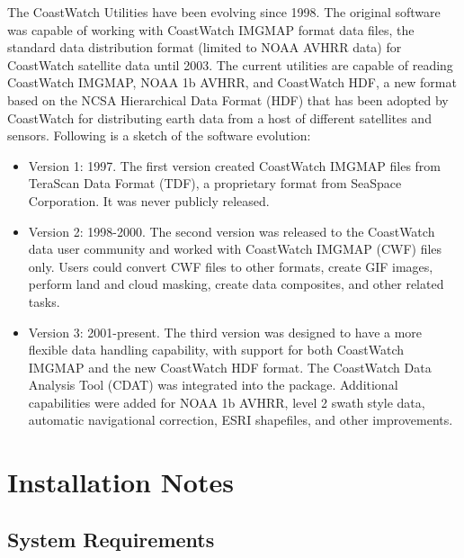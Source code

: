 The CoastWatch Utilities have been evolving since 1998.  The original
software was capable of working with CoastWatch IMGMAP format data
files, the standard data distribution format (limited to NOAA AVHRR
data) for CoastWatch satellite data until 2003.  The current utilities
are capable of reading CoastWatch IMGMAP, NOAA 1b AVHRR, and
CoastWatch HDF, a new format based on the NCSA Hierarchical Data
Format (HDF) that has been adopted by CoastWatch for distributing
earth data from a host of different satellites and sensors.  Following
is a sketch of the software evolution:
\begin{itemize}

  \item Version 1: 1997.  The first version created CoastWatch IMGMAP
  files from TeraScan Data Format (TDF), a proprietary format from
  SeaSpace Corporation.  It was never publicly released.

  \item Version 2: 1998-2000.  The second version was released to the
  CoastWatch data user community and worked with CoastWatch IMGMAP
  (CWF) files only.  Users could convert CWF files to other formats,
  create GIF images, perform land and cloud masking, create data
  composites, and other related tasks.  

  \item Version 3: 2001-present.  The third version was designed to have
  a more flexible data handling capability, with support for both
  CoastWatch IMGMAP and the new CoastWatch HDF format.  The CoastWatch
  Data Analysis Tool (CDAT) was integrated into the package.
  Additional capabilities were added for NOAA 1b AVHRR, level 2 swath
  style data, automatic navigational correction, ESRI shapefiles, and
  other improvements.

\end{itemize}

\section{Installation Notes}

\subsection{System Requirements}

